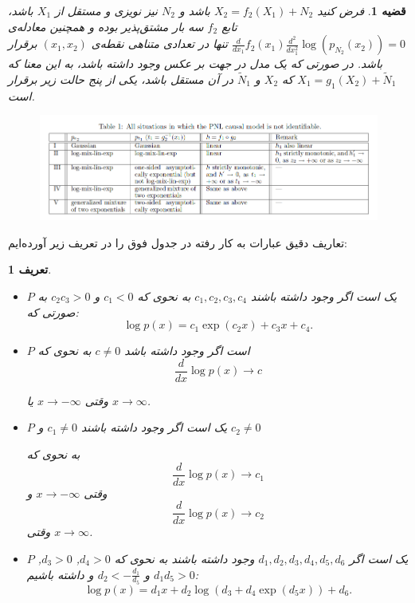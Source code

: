 \documentclass[a4paper,12pt]{article}
\newtheorem{den}{{\large\bf تعریف}}[section]
\newtheorem{thm}{{\large\bf قضیه}}[section]
\begin{document}
\begin{thm}
	فرض کنید 
	$X_2 = f_2(X_1) + N_2$
	باشد و  $N_2$ نیز نویزی 
	و مستقل از $X_1$ باشد، تابع $f_2$ سه بار مشتق‌پذیر بوده و همچنین معادله‌ی 
	$\frac{d}{dx_1}f_2(x_1)\frac{d^2}{dx_1^2}\log (p_{N_2}(x_2)) = 0$
	تنها در تعدادی متناهی نقطه‌ی 
	$(x_1, x_2)$
	برقرار باشد. در صورتی که یک مدل در جهت بر عکس وجود داشته باشد، به این معنا که
	$X_1 = g_1(X_2) + \tilde N_1$
	که $X_2$ و
	$\tilde N_1$
	در آن مستقل باشد، یکی از پنج حالت زیر برقرار است.
	\begin{figure}[h!]
		\centering
		\includegraphics[scale=0.5]{pnl.png}
	\end{figure}
\end{thm}
تعاریف دقیق عبارات به کار رفته در جدول فوق را در تعریف زیر آورده‌ایم:
\begin{den}
	\begin{itemize}
		فرض کنید $p$ چگالی احتمال یک توزیع پیوسته  $P$ باشد.
		\item 
		$P$
		یک 
		است اگر وجود داشته باشند
		$c_1, c_2, c_3, c_4$
		به نحوی که
		$c_1 <0$ 
		و
		$c_2c_3>0$
		به صورتی که:
		$$
		\log p(x) = c_1 \exp(c_2 x) + c_3 x + c_4.
		$$
		
		\item 
		$P$
		است اگر وجود داشته باشد
		$c \neq 0$
		به نحوی که
		$$
		\frac{d}{dx} \log p(x) \rightarrow c
		$$
		
		وقتی $x \rightarrow -\infty$ یا $x \rightarrow \infty$.
		
		\item 
		$P$
		یک
		است اگر وجود داشته باشند
		$c_1 \neq 0$ 
		و
		$c_2 \neq 0$ 
		
		به نحوی که
		$$
		\frac{d}{dx} \log p(x) \rightarrow c_1 
		$$
		وقتی 
		$x \rightarrow -\infty$ 
		و
		$$
		\frac{d}{dx} \log p(x) \rightarrow c_2 
		$$
		وقتی
		$x \rightarrow \infty$.
		\item 
		$P$
		یک 
		است اگر 
		$d_1, d_2, d_3, d_4, d_5, d_6$
		وجود داشته باشند به نحوی که
		$d_4 > 0$, $d_3 > 0$, $d_1 d_5 > 0$ و $d_2 < -\frac{d_1}{d_5}$ 
		و داشته باشیم:
		$$
		\log p(x) = d_1 x + d_2 \log(d_3 + d_4 \exp(d_5 x))+ d_6.
		$$
		
	\end{itemize} 
\end{den}
\end{document}
